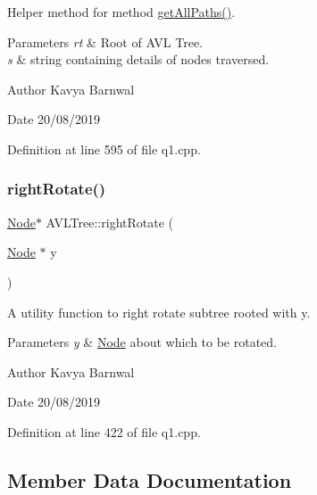 Helper method for method \hyperlink{class_a_v_l_tree_acfeb6a8c2b2ddd309747a7f5d402e2ed}{get\+All\+Paths()}. 
\begin{DoxyParams}{Parameters}
{\em rt} & Root of A\+VL Tree. \\
\hline
{\em s} & string containing details of nodes traversed. \\
\hline
\end{DoxyParams}
\begin{DoxyAuthor}{Author}
Kavya Barnwal 
\end{DoxyAuthor}
\begin{DoxyDate}{Date}
20/08/2019 
\end{DoxyDate}


Definition at line 595 of file q1.\+cpp.

\mbox{\label{class_a_v_l_tree_a735406d043d3dc61e0ed08455381487a}} 
\subsubsection{\texorpdfstring{right\+Rotate()}{rightRotate()}}
{\footnotesize\ttfamily \hyperlink{class_node}{Node}$\ast$ A\+V\+L\+Tree\+::right\+Rotate (\begin{DoxyParamCaption}\item[{\hyperlink{class_node}{Node} $\ast$}]{y }\end{DoxyParamCaption})\hspace{0.3cm}{\ttfamily [inline]}}

A utility function to right rotate subtree rooted with y. 
\begin{DoxyParams}{Parameters}
{\em y} & \hyperlink{class_node}{Node} about which to be rotated. \\
\hline
\end{DoxyParams}
\begin{DoxyAuthor}{Author}
Kavya Barnwal 
\end{DoxyAuthor}
\begin{DoxyDate}{Date}
20/08/2019 
\end{DoxyDate}


Definition at line 422 of file q1.\+cpp.



\subsection{Member Data Documentation}
\mbox{\label{class_a_v_l_tree_a3db9914a012a92648fc774b1112c79f0}} 

